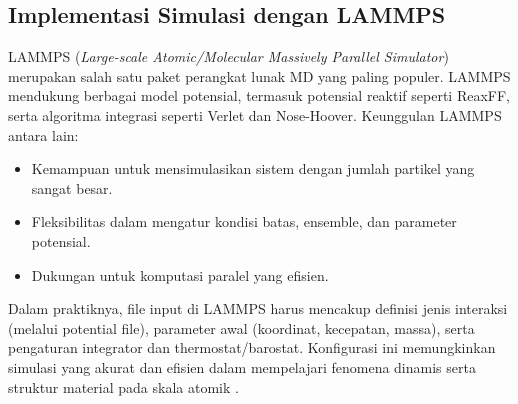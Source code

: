 \subsection{Implementasi Simulasi dengan LAMMPS}
LAMMPS (\emph{Large-scale Atomic/Molecular Massively Parallel Simulator}) merupakan salah satu paket perangkat lunak MD yang paling populer.
LAMMPS mendukung berbagai model potensial, termasuk potensial reaktif seperti ReaxFF, serta algoritma integrasi seperti Verlet dan Nose-Hoover.
Keunggulan LAMMPS antara lain:
\begin{itemize}
    \item Kemampuan untuk mensimulasikan sistem dengan jumlah partikel yang sangat besar.
    \item Fleksibilitas dalam mengatur kondisi batas, ensemble, dan parameter potensial.
    \item Dukungan untuk komputasi paralel yang efisien.
\end{itemize}
Dalam praktiknya, file input di LAMMPS harus mencakup definisi jenis interaksi (melalui potential file), parameter awal (koordinat, kecepatan, massa), serta pengaturan integrator dan thermostat/barostat.
Konfigurasi ini memungkinkan simulasi yang akurat dan efisien dalam mempelajari fenomena dinamis serta struktur material pada skala atomik \citep{Plimpton1995}.

